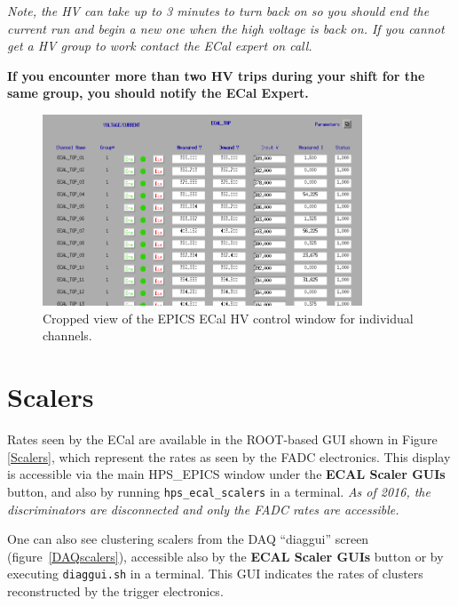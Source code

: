 \documentclass[12pt]{article}
\begin{document}
      {\em Note, the HV can take up to 3 minutes to turn back on so you should end the current run and begin a new one when the high voltage is back on. If you cannot get a HV group to work contact the ECal expert on call.}

      {\bf If you encounter more than two HV trips during your shift for the same group, you should notify the ECal Expert.}

\begin{figure}[htbp]
\center
\includegraphics[width=0.85\textwidth]{pics/ecalhv_setting_2014_12_15-SUBSET.png}
\caption{ \label{HVControl} Cropped view of the EPICS ECal HV control window for individual channels.}
\end{figure}

\clearpage
\newpage
      \section{Scalers}

      Rates seen by the ECal are available in the ROOT-based GUI shown in Figure \ref{Scalers}, which represent the rates as seen by the FADC electronics.  This display is accessible via the main HPS\_EPICS window under the {\bf ECAL Scaler GUIs} button, and also by running \texttt{hps\_ecal\_scalers} in a terminal.  {\em As of 2016, the discriminators are disconnected and only the FADC rates are accessible.}
      
      One can also see clustering scalers from the DAQ ``diaggui'' screen (figure~\ref{DAQscalers}), accessible also by the {\bf ECAL Scaler GUIs} button or by executing \texttt{diaggui.sh} in a terminal.  This GUI indicates the rates of clusters reconstructed by the trigger electronics. 
      
\end{document}

